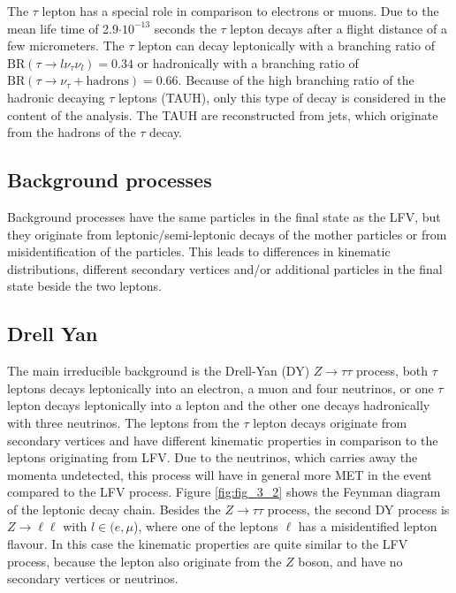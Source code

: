 The $\tau$ lepton \cite{TAU} has a special role in comparison to electrons or muons. Due to the mean life time of 2.9$\cdot 10^{-13}$ seconds the $\tau$ lepton decays after a flight distance of a few micrometers. The $\tau$ lepton can decay leptonically with a branching ratio of $\text{BR}(\tau \to l\nu_{\tau}\nu_{l}) = 0.34$ or hadronically with a branching ratio of $\text{BR}(\tau \to \nu_{\tau} + \text{hadrons}) = 0.66$. Because of the high branching ratio of the hadronic decaying $\tau$ leptons (\gls{TAUH}), only this type of decay is considered in the content of the analysis. The \gls{TAUH} are reconstructed from jets, which originate from the hadrons of the $\tau$ decay. 

\subsection{Background processes}
\label{sec:section_3_1_2}

Background processes have the same particles in the final state as the \gls{LFV}, but they originate from leptonic/semi-leptonic decays of the mother particles or from misidentification of the particles. This leads to differences in kinematic distributions, different secondary vertices and/or additional particles in the final state beside the two leptons. \\

\subsection*{Drell Yan}

The main irreducible background is the Drell-Yan (\gls{DY}) $Z\to\tau\tau$ process, both $\tau$ leptons decays leptonically into an electron, a muon and four neutrinos, or one $\tau$ lepton decays leptonically into a lepton and the other one decays hadronically with three neutrinos. The leptons from the $\tau$ lepton decays originate from secondary vertices and have different kinematic properties in comparison to the leptons originating from \gls{LFV}. Due to the neutrinos, which carries away the momenta undetected, this process will have in general more \gls{MET} in the event compared to the \gls{LFV} process. Figure \ref{fig:fig_3_2} shows the Feynman diagram of the leptonic decay chain. Besides the $Z\to\tau\tau$ process, the second \gls{DY} process is $Z\to\ell\ell$ with $l \in (e, \mu$), where one of the leptons $\ell$ has a misidentified lepton flavour. In this case the kinematic properties are quite similar to the \gls{LFV} process, because the lepton also originate from the $Z$ boson, and have no secondary vertices or neutrinos. \\



